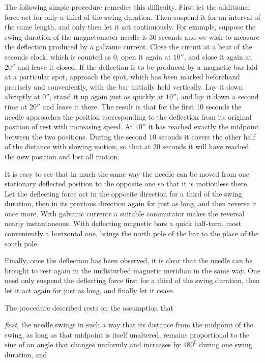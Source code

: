 The following simple procedure remedies this difficulty. First let the additional force act for only a third of the swing duration. Then suspend it for an interval of the same length, and only then let it act continuously. For example, suppose the swing duration of the magnetometer needle is 30 seconds and we wish to measure the deflection produced by a galvanic current. Close the circuit at a beat of the seconds clock, which is counted as 0, open it again at $10''$, and close it again at $20''$ and leave it closed. If the deflection is to be produced by a magnetic bar laid at a particular spot, approach the spot, which has been marked beforehand precisely and conveniently, with the bar initially held vertically. Lay it down abruptly at $0''$, stand it up again just as quickly at $10''$, and lay it down a second time at $20''$ and leave it there. The result is that for the first 10 seconds the needle approaches the position corresponding to the deflection from its original position of rest with increasing speed. At $10''$ it has reached exactly the midpoint between the two positions. During the second 10 seconds it covers the other half of the distance with slowing motion, so that at 20 seconds it will have reached the new position and lost all motion.

It is easy to see that in much the same way the needle can be moved from one stationary deflected position to the opposite one so that it is motionless there. Let the deflecting force act in the opposite direction for a third of the swing duration, then in its previous direction again for just as long, and then reverse it once more. With galvanic currents a suitable commutator makes the reversal nearly instantaneous. With deflecting magnetic bars a quick half-turn, most conveniently a horizontal one, brings the north pole of the bar to the place of the south pole.

Finally, once the deflection has been observed, it is clear that the needle can be brought to rest again in the undisturbed magnetic meridian in the same way. One need only suspend the deflecting force first for a third of the swing duration, then let it act again for just as long, and finally let it cease.

The procedure described rests on the assumption that

\textit{first}, the needle swings in such a way that its distance from the midpoint of the swing, as long as that midpoint is itself unaltered, remains proportional to the sine of an angle that changes uniformly and increases by $180^0$ during one swing duration, and

